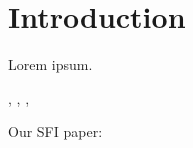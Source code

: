 \section{Introduction}

Lorem ipsum.

\cite{schreiber2000measuring}, \cite{ver2012information}, \cite{shalizi2007discovering}, \cite{paninski2003estimation}

Our SFI paper: \cite{darmon2013detecting}
